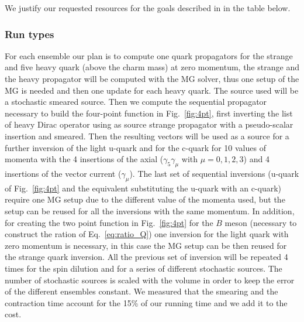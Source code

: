 

We justify our requested resources for the goals described
in  in the table below.

\subsubsection{Run types \label{sec:runtypes}}


For each ensemble our plan is to compute  one quark propagators for the strange
and five heavy quark (above the charm mass) at zero momentum, the strange and the heavy propagator 
will be computed with the MG solver, thus one setup of the MG is needed and then one update for each 
heavy quark. 
The source used will be a stochastic smeared source.
Then we compute the sequential propagator necessary to build the four-point function in Fig.~\ref{fig:4pt},
first inverting the list of heavy Dirac operator using as source strange propagator with a pseudo-scalar
insertion and smeared. Then the resulting vectors will be used as a source for a further inversion of the light u-quark and for the c-quark for 10 values of momenta with the 4 insertions of the axial ($\gamma_5\gamma_\mu$ with $\mu=0,1,2,3$) and 4 insertions of the vector current ($\gamma_\mu$). The last set of sequential inversions (u-quark of Fig.~\ref{fig:4pt} and the equivalent substituting the u-quark with an c-quark) require one MG setup due to the different value of the momenta used, but the setup can be reused for all the inversions with the same momentum.
In addition, for creating the two point function in Fig.~\ref{fig:4pt} for the $B$ meson (necessary to construct the ration of Eq.~\ref{eq:ratio_Q}) one
inversion for the light quark with zero momentum is necessary, in this case the MG setup can be then reused for the strange quark inversion.
All the previous set of inversion will be repeated 4 times for the spin dilution and for a series of different stochastic sources.
The number of stochastic sources is scaled with the volume in order to keep the error of the different ensembles constant. We measured that the smearing and the contraction time account for the 15\% of our running time and we add it to the cost.


